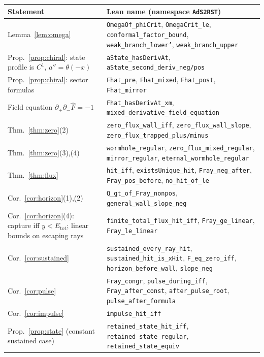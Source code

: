 \documentclass[11pt]{article}
\theoremstyle{remark}
\newcommand{\Etot}{E_{\mathrm{tot}}}
\newcommand{\Fh}{\widehat F}
\newcommand{\lean}[1]{\texttt{#1}}
\begin{document}
\begin{table}[t]
\centering\small
\begin{tabular}{@{}>{\raggedright\arraybackslash}p{}>{\raggedright\arraybackslash}p{}@{}}
\toprule
Statement & Lean name (namespace \lean{AdS2RST})\\
\midrule
Lemma~\ref{lem:omega} & \lean{OmegaOf\_phiCrit}, \lean{OmegaCrit\_le}, \lean{conformal\_factor\_bound}, \lean{weak\_branch\_lower'}, \lean{weak\_branch\_upper}\\
Prop.~\ref{prop:chiral}: state profile is $C^1$, $a''=\theta(-x)$ & \lean{aState\_hasDerivAt}, \lean{aState\_second\_deriv\_neg/pos}\\
Prop.~\ref{prop:chiral}: sector formulas & \lean{Fhat\_pre}, \lean{Fhat\_mixed}, \lean{Fhat\_post}, \lean{Fhat\_mirror}\\
Field equation $\partial_+\partial_-\Fh=-1$ & \lean{Fhat\_hasDerivAt\_xm}, \lean{mixed\_derivative\_field\_equation}\\
Thm.~\ref{thm:zero}(2) & \lean{zero\_flux\_wall\_iff}, \lean{zero\_flux\_wall\_slope}, \lean{zero\_flux\_trapped\_plus/minus}\\
Thm.~\ref{thm:zero}(3),(4) & \lean{wormhole\_regular}, \lean{zero\_flux\_mixed\_regular}, \lean{mirror\_regular}, \lean{eternal\_wormhole\_regular}\\
Thm.~\ref{thm:flux} & \lean{hit\_iff}, \lean{existsUnique\_hit}, \lean{Fray\_neg\_after}, \lean{Fray\_pos\_before}, \lean{no\_hit\_of\_le}\\
Cor.~\ref{cor:horizon}(1),(2) & \lean{Q\_gt\_of\_Fray\_nonpos}, \lean{general\_wall\_slope\_neg}\\
Cor.~\ref{cor:horizon}(4): capture iff $y<\Etot$; linear bounds on escaping rays & \lean{finite\_total\_flux\_hit\_iff}, \lean{Fray\_ge\_linear}, \lean{Fray\_le\_linear}\\
Cor.~\ref{cor:sustained} & \lean{sustained\_every\_ray\_hit}, \lean{sustained\_hit\_is\_xHit}, \lean{F\_eq\_zero\_iff}, \lean{horizon\_before\_wall}, \lean{slope\_neg}\\
Cor.~\ref{cor:pulse} & \lean{Fray\_congr}, \lean{pulse\_during\_iff}, \lean{Fray\_after\_const}, \lean{after\_pulse\_root}, \lean{pulse\_after\_formula}\\
Cor.~\ref{cor:impulse} & \lean{impulse\_hit\_iff}\\
Prop.~\ref{prop:state} (constant sustained case) & \lean{retained\_state\_hit\_iff}, \lean{retained\_state\_regular}, \lean{retained\_state\_equiv}\\

\end{tabular}
\end{table}
\end{document}
